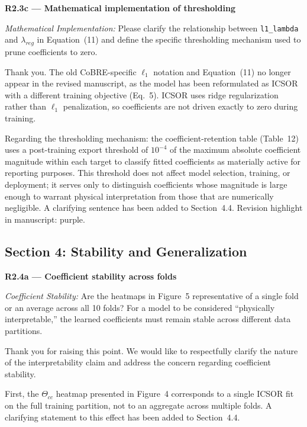 \documentclass[a4paper,11pt]{article}
\newcommand{\reviewlabel}[1]{\noindent\textbf{\textcolor{accentblue}{#1}}\par\medskip}
\newcommand{\revhighlight}[2]{\textcolor{#1}{Revision highlight in manuscript: #2.}}
\begin{document}
\reviewlabel{R2.3c --- Mathematical implementation of thresholding}
\begin{reviewbox}
\textit{Mathematical Implementation:} Please clarify the relationship between \texttt{l1\_lambda} and $\lambda_{reg}$ in Equation~(11) and define the specific thresholding mechanism used to prune coefficients to zero.
\end{reviewbox}

Thank you. The old CoBRE-specific $\ell_1$ notation and Equation~(11) no longer appear in the revised manuscript, as the model has been reformulated as ICSOR with a different training objective (Eq.~5). ICSOR uses ridge regularization rather than $\ell_1$ penalization, so coefficients are not driven exactly to zero during training.

Regarding the thresholding mechanism: the coefficient-retention table (Table~12) uses a post-training export threshold of $10^{-4}$ of the maximum absolute coefficient magnitude within each target to classify fitted coefficients as materially active for reporting purposes. This threshold does not affect model selection, training, or deployment; it serves only to distinguish coefficients whose magnitude is large enough to warrant physical interpretation from those that are numerically negligible. A clarifying sentence has been added to Section~4.4. \revhighlight{revRtwoOne}{purple}

\subsection*{Section 4: Stability and Generalization}

\reviewlabel{R2.4a --- Coefficient stability across folds}
\begin{reviewbox}
\textit{Coefficient Stability:} Are the heatmaps in Figure~5 representative of a single fold or an average across all 10 folds? For a model to be considered ``physically interpretable,'' the learned coefficients must remain stable across different data partitions.
\end{reviewbox}

Thank you for raising this point. We would like to respectfully clarify the nature of the interpretability claim and address the concern regarding coefficient stability.

First, the $\Theta_{cc}$ heatmap presented in Figure~4 corresponds to a single ICSOR fit on the full training partition, not to an aggregate across multiple folds. A clarifying statement to this effect has been added to Section~4.4.
\end{document}
